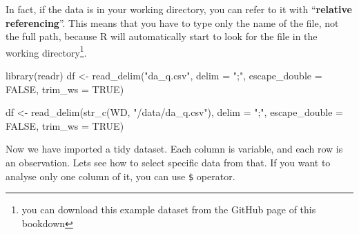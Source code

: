 \documentclass[
]{article}
\newenvironment{Shaded}{\begin{snugshade}}{\end{snugshade}}
\newcommand{\AttributeTok}[1]{\textcolor[rgb]{0.77,0.63,0.00}{#1}}
\newcommand{\ConstantTok}[1]{\textcolor[rgb]{0.00,0.00,0.00}{#1}}
\newcommand{\FunctionTok}[1]{\textcolor[rgb]{0.00,0.00,0.00}{#1}}
\newcommand{\NormalTok}[1]{#1}
\newcommand{\OtherTok}[1]{\textcolor[rgb]{0.56,0.35,0.01}{#1}}
\newcommand{\StringTok}[1]{\textcolor[rgb]{0.31,0.60,0.02}{#1}}
\begin{document}
In fact, if the data is in your working directory, you can refer to it with ``\textbf{relative referencing}''. This means that you have to type only the name of the file, not the full path, because R will automatically start to look for the file in the working directory\footnote{you can download this example dataset from the GitHub page of this bookdown}.

\begin{Shaded}
\begin{Highlighting}[]
\FunctionTok{library}\NormalTok{(readr)}
\NormalTok{df }\OtherTok{\textless{}{-}} \FunctionTok{read\_delim}\NormalTok{(}\StringTok{"da\_q.csv"}\NormalTok{, }\AttributeTok{delim =} \StringTok{";"}\NormalTok{, }\AttributeTok{escape\_double =} \ConstantTok{FALSE}\NormalTok{, }\AttributeTok{trim\_ws =} \ConstantTok{TRUE}\NormalTok{)}
\end{Highlighting}
\end{Shaded}

\begin{Shaded}
\begin{Highlighting}[]
\NormalTok{df }\OtherTok{\textless{}{-}} \FunctionTok{read\_delim}\NormalTok{(}\FunctionTok{str\_c}\NormalTok{(WD, }\StringTok{"/data/da\_q.csv"}\NormalTok{), }\AttributeTok{delim =} \StringTok{";"}\NormalTok{, }\AttributeTok{escape\_double =} \ConstantTok{FALSE}\NormalTok{, }\AttributeTok{trim\_ws =} \ConstantTok{TRUE}\NormalTok{)}
\end{Highlighting}
\end{Shaded}

Now we have imported a tidy dataset. Each column is variable, and each row is an observation. Lets see how to select specific data from that. If you want to analyse only one column of it, you can use \texttt{\$} operator.
\end{document}
